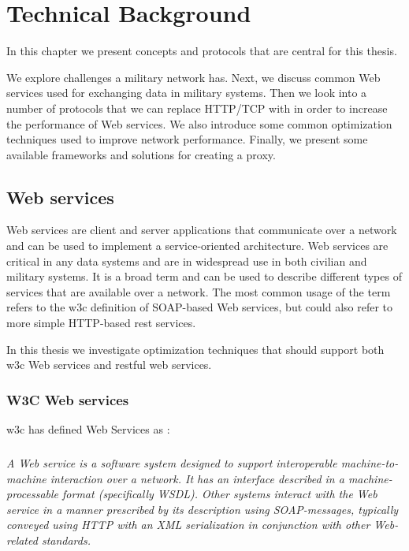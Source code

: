 \chapter{Technical Background}

In this chapter we present concepts and protocols that are central for this
thesis.

We explore challenges a military network has. Next, we discuss common Web
services used for exchanging data in military systems. Then we look into a
number of protocols that we can replace HTTP/TCP with in order to increase the
performance of Web services. We also introduce some common optimization
techniques used to improve network performance. Finally, we present some
available frameworks and solutions for creating a proxy.

\section{Web services}
\label{web-services}
Web services are client and server applications that communicate over a
network and can be used to implement a service-oriented architecture. Web
services are critical in any data systems and are in widespread use in both
civilian and military systems. It is a broad term and can be used to describe
different types of services that are available over a network. The most common
usage of the term refers to the \gls{w3c} definition of SOAP-based Web
services, but could also refer to more simple HTTP-based \gls{rest} services.

In this thesis we investigate optimization techniques that should support both
\gls{w3c} Web services and \gls{rest}ful web services.

\subsection{W3C Web services}

\gls{w3c} has defined Web Services as \cite{wrc-web-service}:

\paragraph{}
\textit{
    A Web service is a software system designed to support interoperable
    machine-to-machine interaction over a network. It has an interface described in
    a machine-processable format (specifically WSDL). Other systems interact with
    the Web service in a manner prescribed by its description using SOAP-messages,
    typically conveyed using HTTP with an XML serialization in conjunction with
    other Web-related standards.
}

